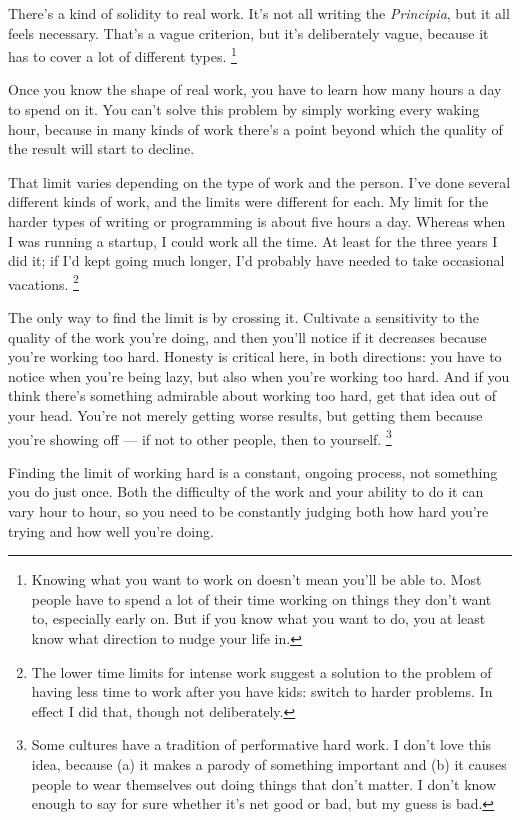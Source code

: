 There's a kind of solidity to real work. It's not all writing the
\emph{Principia}, but it all feels necessary. That's a vague criterion,
but it's deliberately vague, because it has to cover a lot of different
types. \footnote{Knowing what you want to work on doesn't mean you'll be able to.
Most people have to spend a lot of their time working on things they
don't want to, especially early on. But if you know what you want to do,
you at least know what direction to nudge your life in.}

Once you know the shape of real work, you have to learn how many hours a
day to spend on it. You can't solve this problem by simply working every
waking hour, because in many kinds of work there's a point beyond which
the quality of the result will start to decline.

That limit varies depending on the type of work and the person. I've
done several different kinds of work, and the limits were different for
each. My limit for the harder types of writing or programming is about
five hours a day. Whereas when I was running a startup, I could work all
the time. At least for the three years I did it; if I'd kept going much
longer, I'd probably have needed to take occasional vacations.
\footnote{The lower time limits for intense work suggest a solution to the
problem of having less time to work after you have kids: switch to
harder problems. In effect I did that, though not deliberately.}

The only way to find the limit is by crossing it. Cultivate a
sensitivity to the quality of the work you're doing, and then you'll
notice if it decreases because you're working too hard. Honesty is
critical here, in both directions: you have to notice when you're being
lazy, but also when you're working too hard. And if you think there's
something admirable about working too hard, get that idea out of your
head. You're not merely getting worse results, but getting them because
you're showing off --- if not to other people, then to yourself.
\footnote{Some cultures have a tradition of performative hard work. I
don't love this idea, because (a) it makes a parody of something
important and (b) it causes people to wear themselves out doing things
that don't matter. I don't know enough to say for sure whether it's net
good or bad, but my guess is bad.}

Finding the limit of working hard is a constant, ongoing process, not
something you do just once. Both the difficulty of the work and your
ability to do it can vary hour to hour, so you need to be constantly
judging both how hard you're trying and how well you're doing.

